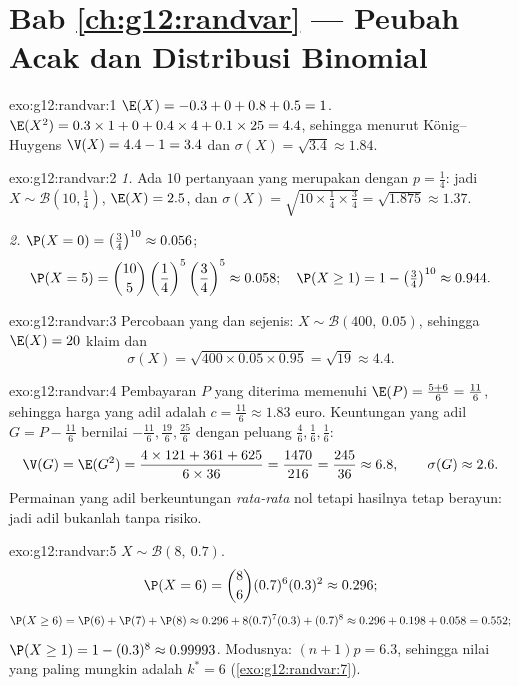 \section*{Bab \ref{ch:g12:randvar} --- Peubah Acak dan Distribusi Binomial}

\begin{solution}{exo:g12:randvar:1}
$\E(X) = -0.3 + 0 + 0.8 + 0.5 = 1$.
$\E(X^2) = 0.3 \times 1 + 0 + 0.4\times4 + 0.1\times25 = 4.4$, sehingga menurut
König--Huygens $\V(X) = 4.4 - 1 = 3.4$ dan
$\sigma(X) = \sqrt{3.4} \approx 1.84$.
\end{solution}

\begin{solution}{exo:g12:randvar:2}
\emph{1.} Ada $10$ pertanyaan yang merupakan   dengan
$p = \frac14$: jadi $X \sim \mathcal B\left(10, \frac14\right)$,
$\E(X) = 2.5$, dan
$\sigma(X) = \sqrt{10 \times \frac14 \times \frac34} = \sqrt{1.875}
\approx 1.37$.

\emph{2.} $\P(X = 0) = \left(\frac34\right)^{10} \approx 0.056$;
\[
\P(X = 5) = \binom{10}{5}\left(\frac14\right)^5\left(\frac34\right)^5
\approx 0.058;
\quad
\P(X \geq 1) = 1 - \left(\tfrac34\right)^{10} \approx 0.944 .
\]
\end{solution}

\begin{solution}{exo:g12:randvar:3}
Percobaan yang  dan sejenis: $X \sim \mathcal B(400,\ 0.05)$, sehingga
$\E(X) = 20$ klaim dan
\[
\sigma(X) = \sqrt{400 \times 0.05 \times 0.95} = \sqrt{19} \approx 4.4 .
\]
\end{solution}

\begin{solution}{exo:g12:randvar:4}
Pembayaran $P$ yang diterima memenuhi
$\E(P) = \frac{5 + 6}{6} = \frac{11}{6}$, sehingga harga yang adil adalah
$c = \frac{11}{6} \approx 1.83$ euro. Keuntungan yang adil $G = P - \frac{11}6$
bernilai $-\frac{11}{6}, \frac{19}{6}, \frac{25}{6}$ dengan peluang
$\frac46, \frac16, \frac16$:
\[
\V(G) = \E(G^2)
= \frac{4 \times 121 + 361 + 625}{6 \times 36} = \frac{1470}{216}
= \frac{245}{36} \approx 6.8,
\qquad \sigma(G) \approx 2.6 .
\]
Permainan yang adil berkeuntungan \emph{rata-rata} nol tetapi hasilnya tetap berayun:
jadi adil bukanlah tanpa risiko.
\end{solution}

\begin{solution}{exo:g12:randvar:5}
$X \sim \mathcal B(8,\ 0.7)$.
\[
\P(X = 6) = \binom86 (0.7)^6(0.3)^2 \approx 0.296 ;
\]
\[
\P(X \geq 6) = \P(6) + \P(7) + \P(8)
\approx 0.296 + 8(0.7)^7(0.3) + (0.7)^8
\approx 0.296 + 0.198 + 0.058 = 0.552 ;
\]
$\P(X \geq 1) = 1 - (0.3)^8 \approx 0.99993$. Modusnya:
$(n+1)p = 6.3$, sehingga nilai yang paling mungkin adalah $k^* = 6$
(\cref{exo:g12:randvar:7}).
\end{solution}

